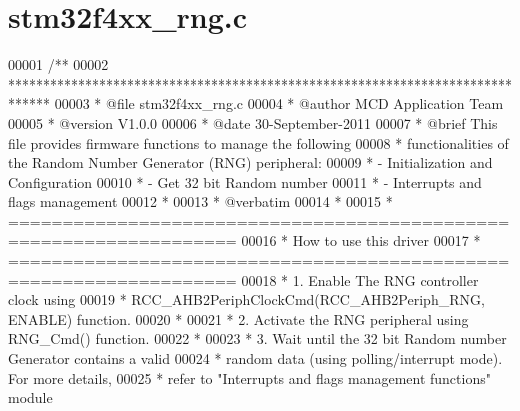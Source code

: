 \section{stm32f4xx\+\_\+rng.\+c}
\label{stm32f4xx__rng_8c_source}

\begin{DoxyCode}
00001 \textcolor{comment}{/**}
00002 \textcolor{comment}{  ******************************************************************************}
00003 \textcolor{comment}{  * @file    stm32f4xx\_rng.c}
00004 \textcolor{comment}{  * @author  MCD Application Team}
00005 \textcolor{comment}{  * @version V1.0.0}
00006 \textcolor{comment}{  * @date    30-September-2011}
00007 \textcolor{comment}{    * @brief This file provides firmware functions to manage the following }
00008 \textcolor{comment}{  *          functionalities of the Random Number Generator (RNG) peripheral:           }
00009 \textcolor{comment}{  *           - Initialization and Configuration }
00010 \textcolor{comment}{  *           - Get 32 bit Random number      }
00011 \textcolor{comment}{  *           - Interrupts and flags management       }
00012 \textcolor{comment}{  *         }
00013 \textcolor{comment}{  *  @verbatim}
00014 \textcolor{comment}{  *                               }
00015 \textcolor{comment}{  *          ===================================================================      }
00016 \textcolor{comment}{  *                                   How to use this driver}
00017 \textcolor{comment}{  *          ===================================================================          }
00018 \textcolor{comment}{  *          1. Enable The RNG controller clock using }
00019 \textcolor{comment}{  *            RCC\_AHB2PeriphClockCmd(RCC\_AHB2Periph\_RNG, ENABLE) function.}
00020 \textcolor{comment}{  *              }
00021 \textcolor{comment}{  *          2. Activate the RNG peripheral using RNG\_Cmd() function.}
00022 \textcolor{comment}{  *          }
00023 \textcolor{comment}{  *          3. Wait until the 32 bit Random number Generator contains a valid }
00024 \textcolor{comment}{  *            random data (using polling/interrupt mode). For more details, }
00025 \textcolor{comment}{  *            refer to "Interrupts and flags management functions" module }

\end{DoxyCode}
